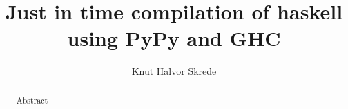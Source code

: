 \documentclass{article}
\begin{document}
\title{Just in time compilation of haskell using PyPy and GHC}
\author{Knut Halvor Skrede}
\maketitle

\begin{abstract}
Abstract
\end{abstract}


\tableofcontents

\clearpage

\setlength\LTleft{0pt}
\setlength\LTright{0pt}















\end{document}

